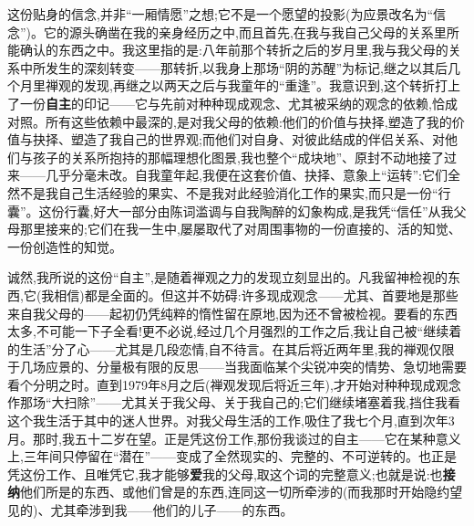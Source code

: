 这份贴身的信念,并非“一厢情愿”之想;它不是一个愿望的投影(为应景改名为“信念”)。它的源头确凿在我的亲身经历之中,而且首先\dmark{},在我与我自己父母的关系里所能确认的东西之中。我这里指的是:八年前那个转折之后的岁月里,我与我父母的关系中所发生的深刻转变——那转折,以我身上那场“阴的苏醒”为标记,继之以其后几个月里禅观的发现,再继之以两天之后与我童年的“重逢”。我意识到,这个转折打上了一份\textbf{自主}的印记——它与先前对种种现成观念、尤其被采纳的观念的依赖,恰成对照。所有这些依赖中最深的,是对我父母的依赖:他们的价值与抉择,塑造了我的价值与抉择、塑造了我自己的世界观;而他们对自身、对彼此结成的伴侣关系、对他们与孩子的关系所抱持的那幅理想化图景,我也整个“成块地”、原封不动地接了过来——几乎分毫未改。自我童年起,我便在这套价值、抉择、意象上“运转”:它们全然不是我自己生活经验的果实、不是我对此经验消化工作的果实,而只是一份“行囊”。这份行囊,好大一部分由陈词滥调与自我陶醉的幻象构成,是我凭“信任”从我父母那里接来的;它们在我一生中,屡屡取代了对周围事物的一份直接的、活的知觉、一份创造性的知觉。

诚然,我所说的这份“自主”,是随着禅观之力的发现立刻显出的。凡我留神检视的东西,它(我相信)都是全面的。但这并不妨碍:许多现成观念——尤其、首要地是那些来自我父母的——起初仍凭纯粹的惰性留在原地,因为还不曾被检视。要看的东西太多,不可能一下子全看!更不必说,经过几个月强烈的工作之后,我让自己被“继续着的生活”分了心——尤其是几段恋情,自不待言。在其后将近两年里,我的禅观仅限于几场应景的、分量极有限的反思——当我面临某个尖锐冲突的情势、急切地需要看个分明之时。直到1979年8月之后(禅观发现后将近三年),才开始对种种现成观念作那场“大扫除”——尤其关于我父母、关于我自己的;它们继续堵塞着我,挡住我看这个我生活于其中的迷人世界。对我父母生活的工作,吸住了我七个月,直到次年3月。那时,我五十二岁在望。正是凭这份工作,那份我谈过的自主——它在某种意义上,三年间只停留在“潜在”——变成了全然现实的、完整的、不可逆转的。也正是凭这份工作、且唯凭它,我才能够\textbf{爱}我的父母,取这个词的完整意义;也就是说:也\textbf{接纳}他们所是的东西、或他们曾是的东西,连同这一切所牵涉的(而我那时开始隐约望见的)、尤其牵涉到我——他们的儿子——的东西。

